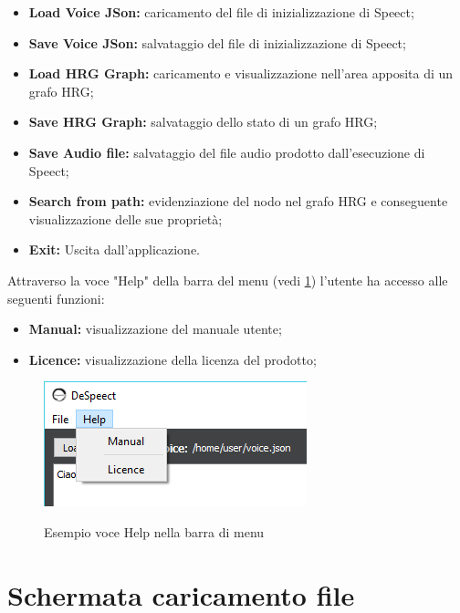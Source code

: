 		\begin{itemize}
			\item \textbf{Load Voice JSon:} caricamento del file di inizializzazione di Speect;
			\item \textbf{Save Voice JSon:} salvataggio del file di inizializzazione di Speect;
			\item \textbf{Load HRG Graph:} caricamento e visualizzazione nell'area apposita di un grafo HRG;
			\item \textbf{Save HRG Graph:} salvataggio dello stato di un grafo HRG;
			\item \textbf{Save Audio file:} salvataggio del file audio prodotto dall'esecuzione di Speect;
			\item \textbf{Search from path:} evidenziazione del nodo nel grafo HRG e conseguente visualizzazione delle sue proprietà;
			\item \textbf{Exit:} Uscita dall'applicazione.
		\end{itemize}
		 Attraverso la voce "Help" della barra del menu (vedi \ref{fig:menuhelp}) l'utente ha accesso alle seguenti funzioni:
		\begin{itemize}
			\item \textbf{Manual:} visualizzazione del manuale utente;
			\item \textbf{Licence:} visualizzazione della licenza del prodotto;
			
		\end{itemize}
	
		\begin{figure}[htp]
			\caption{Esempio voce Help nella barra di menu}
			\centering
			\includegraphics[]{../img/menu-help.png}
			\label{fig:menuhelp}
		\end{figure}
		
	\section{Schermata caricamento file}
	
